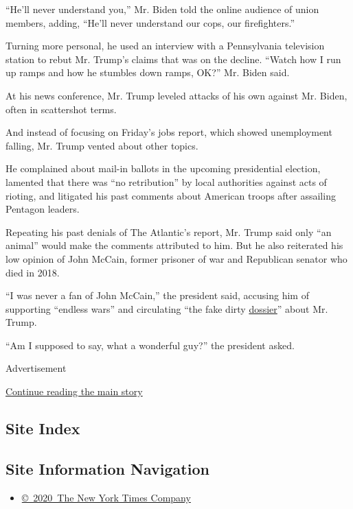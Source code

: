 ``He'll never understand you,'' Mr. Biden told the online audience of
union members, adding, ``He'll never understand our cops, our
firefighters.''

Turning more personal, he used an interview with a Pennsylvania
television station to rebut Mr. Trump's claims that was on the decline.
``Watch how I run up ramps and how he stumbles down ramps, OK?'' Mr.
Biden said.

At his news conference, Mr. Trump leveled attacks of his own against Mr.
Biden, often in scattershot terms.

And instead of focusing on Friday's jobs report, which showed
unemployment falling, Mr. Trump vented about other topics.

He complained about mail-in ballots in the upcoming presidential
election, lamented that there was ``no retribution'' by local
authorities against acts of rioting, and litigated his past comments
about American troops after assailing Pentagon leaders.

Repeating his past denials of The Atlantic's report, Mr. Trump said only
``an animal'' would make the comments attributed to him. But he also
reiterated his low opinion of John McCain, former prisoner of war and
Republican senator who died in 2018.

``I was never a fan of John McCain,'' the president said, accusing him
of supporting ``endless wars'' and circulating ``the fake dirty
\href{https://www.nytimes3xbfgragh.onion/2020/07/25/us/politics/igor-danchenko-steele-dossier.html}{dossier}''
about Mr. Trump.

``Am I supposed to say, what a wonderful guy?'' the president asked.

Advertisement

\protect\hyperlink{after-bottom}{Continue reading the main story}

\hypertarget{site-index}{%
\subsection{Site Index}\label{site-index}}

\hypertarget{site-information-navigation}{%
\subsection{Site Information
Navigation}\label{site-information-navigation}}

\begin{itemize}
\tightlist
\item
  \href{https://help.nytimes3xbfgragh.onion/hc/en-us/articles/115014792127-Copyright-notice}{©~2020~The
  New York Times Company}
\end{itemize}

